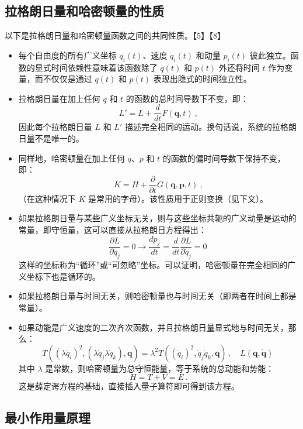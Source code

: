 \subsection{拉格朗日量和哈密顿量的性质}  
以下是拉格朗日量和哈密顿量函数之间的共同性质。【5】【8】
\begin{itemize}
\item 每个自由度的所有广义坐标 \( q_i(t) \)、速度 \( \dot{q}_i(t) \) 和动量 \( p_i(t) \) 彼此独立。函数的显式时间依赖性意味着该函数除了 \( q(t) \) 和 \( p(t) \) 外还将时间 \( t \) 作为变量，而不仅仅是通过 \( q(t) \) 和 \( p(t) \) 表现出隐式的时间独立性。
\item 拉格朗日量在加上任何 \( q \) 和 \( t \) 的函数的总时间导数下不变，即：
\[
L' = L + \frac{d}{dt}F(\mathbf{q}, t) ~,
\]
因此每个拉格朗日量 \( L \) 和 \( L' \) 描述完全相同的运动。换句话说，系统的拉格朗日量不是唯一的。
\item 同样地，哈密顿量在加上任何 \( q \)、\( p \) 和 \( t \) 的函数的偏时间导数下保持不变，即：
\[
K = H + \frac{\partial}{\partial t}G(\mathbf{q}, \mathbf{p}, t) ~,
\]
（在这种情况下 \( K \) 是常用的字母）。该性质用于正则变换（见下文）。
\item 如果拉格朗日量与某些广义坐标无关，则与这些坐标共轭的广义动量是运动的常量，即守恒量，这可以直接从拉格朗日方程得出：
\[
\frac{\partial L}{\partial q_j} = 0 \rightarrow \frac{dp_j}{dt} = \frac{d}{dt} \frac{\partial L}{\partial \dot{q}_j} = 0~
\]
这样的坐标称为“循环”或“可忽略”坐标。可以证明，哈密顿量在完全相同的广义坐标下也是循环的。
\item 如果拉格朗日量与时间无关，则哈密顿量也与时间无关（即两者在时间上都是常量）。  
\item 如果动能是广义速度的二次齐次函数，并且拉格朗日量显式地与时间无关，那么：
\[
T((\lambda \dot{q}_i)^2, (\lambda \dot{q}_j \lambda \dot{q}_k), \mathbf{q}) = \lambda^2 T((\dot{q}_i)^2, \dot{q}_j \dot{q}_k, \mathbf{q}) \,, \quad L(\mathbf{q}, \mathbf{\dot{q}})~
\]
其中 \( \lambda \) 是常数，则哈密顿量为总守恒能量，等于系统的总动能和势能：
\[
H = T + V = E ~.
\]
这是薛定谔方程的基础，直接插入量子算符即可得到该方程。
\end{itemize}
\subsection{最小作用量原理}